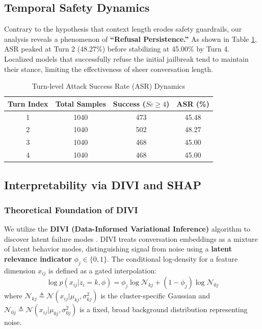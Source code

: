 \documentclass[conference]{IEEEtran}
\begin{document}
\subsection{Temporal Safety Dynamics}
Contrary to the hypothesis that context length erodes safety guardrails, our analysis reveals a phenomenon of \textbf{``Refusal Persistence.''} As shown in Table \ref{tab:turn_asr}, ASR peaked at Turn 2 (48.27\%) before stabilizing at 45.00\% by Turn 4. Localized models that successfully refuse the initial jailbreak tend to maintain their stance, limiting the effectiveness of sheer conversation length.

\begin{table}[t]
\centering
\footnotesize
\caption{Turn-level Attack Success Rate (ASR) Dynamics}
\label{tab:turn_asr}
\begin{tabularx}{\columnwidth}{@{}c c c c@{}}
\toprule
\textbf{Turn Index} & \textbf{Total Samples} & \textbf{Success ($Sc \ge 4$)} & \textbf{ASR (\%)} \\
\midrule
1 & 1040 & 473 & 45.48 \\
2 & 1040 & 502 & 48.27 \\
3 & 1040 & 468 & 45.00 \\
4 & 1040 & 468 & 45.00 \\
\bottomrule
\end{tabularx}
\end{table}

\subsection{Interpretability via DIVI and SHAP}

\subsubsection{Theoretical Foundation of DIVI}
We utilize the \textbf{DIVI (Data-Informed Variational Inference)} algorithm to discover latent failure modes \cite{anonymous2025divi}. DIVI treats conversation embeddings as a mixture of latent behavior modes, distinguishing signal from noise using a \textbf{latent relevance indicator} $\phi_j \in \{0,1\}$\cite{anonymous2025divi}. The conditional log-density for a feature dimension $x_{ij}$ is defined as a gated interpolation\cite{anonymous2025divi}:
\begin{equation}
\log p(x_{ij}|z_i = k, \phi) = \phi_j \log \mathcal{N}_{kj} + (1-\phi_j) \log \mathcal{N}_{0j}
\end{equation}
where $\mathcal{N}_{kj} \triangleq \mathcal{N}(x_{ij}|\mu_{kj}, \sigma_{kj}^{2})$ is the cluster-specific Gaussian and $\mathcal{N}_{0j} \triangleq \mathcal{N}(x_{ij}|\mu_{0j}, \sigma_{0j}^{2})$ is a fixed, broad background distribution representing noise\cite{anonymous2025divi}.
\end{document}
